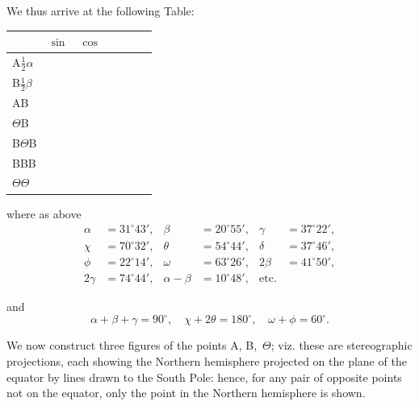\documentclass[11pt,a4paper]{book}
\begin{document}
\begin{art}
We thus arrive at the following Table:

\begin{center}
\begin{tabular}{|l|l|l|l|l|l|l|}
\hline
& $\sin$ & $\cos$ & & & & \\
\hline
A$\frac{1}{2}\alpha$ & & & & & & \\
B$\frac{1}{2}\beta$ & & & & & & \\
AB & & & & & & \\
$\Theta$B & & & & & & \\
B$\Theta$B & & & & & & \\
BBB & & & & & & \\
$\Theta$$\Theta$ & & & & & & \\
\hline
\end{tabular}
\end{center}

where as above
\begin{align*}
\alpha &= 31^\circ 43', & \beta &= 20^\circ 55', & \gamma &= 37^\circ 22', \\
\chi &= 70^\circ 32', & \theta &= 54^\circ 44', & \delta &= 37^\circ 46', \\
\phi &= 22^\circ 14', & \omega &= 63^\circ 26', & 2\beta &= 41^\circ 50', \\
2\gamma &= 74^\circ 44', & \alpha - \beta &= 10^\circ 48', & \text{etc.}
\end{align*}

and
\[
\alpha + \beta + \gamma = 90^\circ, \quad \chi + 2\theta = 180^\circ, \quad \omega + \phi = 60^\circ.
\]
\end{art}

\begin{art}
We now construct three figures of the points A, B,~$\Theta$; viz. these are
stereographic projections, each showing the Northern hemisphere projected
on the plane of the equator by lines drawn to the South Pole: hence, for
any pair of opposite points not on the equator, only the point in the
Northern hemisphere is shown.
\end{art}
\end{document}
